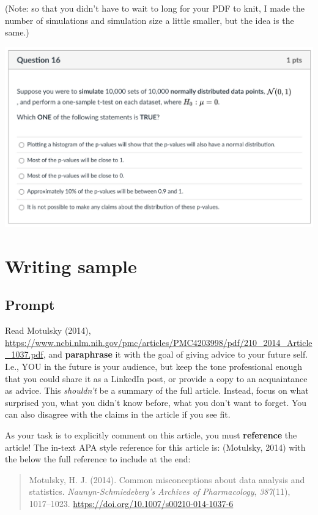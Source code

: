 \documentclass[
  openany]{book}
\begin{document}
(Note: so that you didn't have to wait to long for your PDF to knit, I made the number of simulations and simulation size a little smaller, but the idea is the same.)

\includegraphics[width=1\linewidth]{images/assessments/q16}

\hypertarget{writing-sample-1}{%
\section{Writing sample}\label{writing-sample-1}}

\hypertarget{prompt-1}{%
\subsection{Prompt}\label{prompt-1}}

Read Motulsky (2014), \url{https://www.ncbi.nlm.nih.gov/pmc/articles/PMC4203998/pdf/210_2014_Article_1037.pdf}, and \textbf{paraphrase} it with the goal of giving advice to your future self. I.e., YOU in the future is your audience, but keep the tone professional enough that you could share it as a LinkedIn post, or provide a copy to an acquaintance as advice. This \emph{shouldn't} be a summary of the full article. Instead, focus on what surprised you, what you didn't know before, what you don't want to forget. You can also disagree with the claims in the article if you see fit.

As your task is to explicitly comment on this article, you must \textbf{reference} the article! The in-text APA style reference for this article is: (Motulsky, 2014) with the below the full reference to include at the end:

\begin{quote}
Motulsky, H. J. (2014). Common misconceptions about data analysis and statistics. \emph{Naunyn-Schmiedeberg's Archives of Pharmacology}, \emph{387}(11), 1017--1023. \url{https://doi.org/10.1007/s00210-014-1037-6}
\end{quote}
\end{document}

